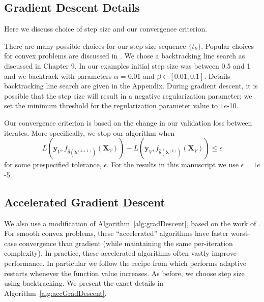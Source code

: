 \documentclass[10pt,letterpaper]{article}
\begin{document}
\subsection{Gradient Descent Details}
Here we discuss choice of step size and our convergence criterion.

There are many possible choices for our step size sequence $\{t_k\}$. Popular choices for convex problems are discussed in \citet{boyd2004convex}. We chose a backtracking line search as discussed in Chapter 9. In our examples initial step size was between 0.5 and 1 and we backtrack with parameters $\alpha = 0.01$ and $\beta \in [0.01, 0.1]$. Details backtracking line search are given in the Appendix. During gradient descent, it is possible that the step size will result in a negative regularization parameter; we set the minimum threshold for the regularization parameter value to $1e$-10.

Our convergence criterion is based on the change in our validation loss between iterates. More specifically, we stop our algorithm when
\[
L \left( \boldsymbol{y}_V, f_{\hat{\theta}(\boldsymbol{\lambda}^{(k+1)})}(\boldsymbol{X}_V)\right) - L \left( \boldsymbol{y}_V, f_{\hat{\theta}(\boldsymbol{\lambda}^{(k)})}(\boldsymbol{X}_V)\right) \leq \epsilon
\]
for some prespecified tolerance, $\epsilon$. For the results in this manuscript we use $\epsilon = 1e$-5.

\subsection{Accelerated Gradient Descent}
We also use a modification of Algorithm~\ref{alg:gradDescent}, based on the work of \citet{nesterov1983method}. For smooth convex problems, these ``accelerated'' algorithms have faster worst-case convergence than gradient (while maintaining the same per-iteration complexity). In practice, these accelerated algorithms often vastly improve performance. In particular we follow the recipe from \citet{o2013adaptive} which performs adaptive restarts whenever the function value increases. As before, we choose step size using backtracking. We present the exact details in Algorithm~\ref{alg:accGradDescent}.
\end{document}
